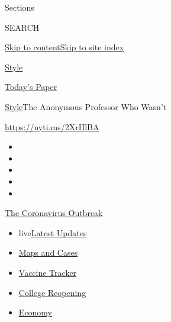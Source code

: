 Sections

SEARCH

\protect\hyperlink{site-content}{Skip to
content}\protect\hyperlink{site-index}{Skip to site index}

\href{https://www.nytimes3xbfgragh.onion/section/style}{Style}

\href{https://myaccount.nytimes3xbfgragh.onion/auth/login?response_type=cookie\&client_id=vi}{}

\href{https://www.nytimes3xbfgragh.onion/section/todayspaper}{Today's
Paper}

\href{/section/style}{Style}\textbar{}The Anonymous Professor Who Wasn't

\url{https://nyti.ms/2XrHlBA}

\begin{itemize}
\item
\item
\item
\item
\item
\end{itemize}

\href{https://www.nytimes3xbfgragh.onion/news-event/coronavirus?action=click\&pgtype=Article\&state=default\&region=TOP_BANNER\&context=storylines_menu}{The
Coronavirus Outbreak}

\begin{itemize}
\tightlist
\item
  live\href{https://www.nytimes3xbfgragh.onion/2020/08/04/world/coronavirus-cases.html?action=click\&pgtype=Article\&state=default\&region=TOP_BANNER\&context=storylines_menu}{Latest
  Updates}
\item
  \href{https://www.nytimes3xbfgragh.onion/interactive/2020/us/coronavirus-us-cases.html?action=click\&pgtype=Article\&state=default\&region=TOP_BANNER\&context=storylines_menu}{Maps
  and Cases}
\item
  \href{https://www.nytimes3xbfgragh.onion/interactive/2020/science/coronavirus-vaccine-tracker.html?action=click\&pgtype=Article\&state=default\&region=TOP_BANNER\&context=storylines_menu}{Vaccine
  Tracker}
\item
  \href{https://www.nytimes3xbfgragh.onion/2020/08/02/us/covid-college-reopening.html?action=click\&pgtype=Article\&state=default\&region=TOP_BANNER\&context=storylines_menu}{College
  Reopening}
\item
  \href{https://www.nytimes3xbfgragh.onion/live/2020/08/04/business/stock-market-today-coronavirus?action=click\&pgtype=Article\&state=default\&region=TOP_BANNER\&context=storylines_menu}{Economy}
\end{itemize}

